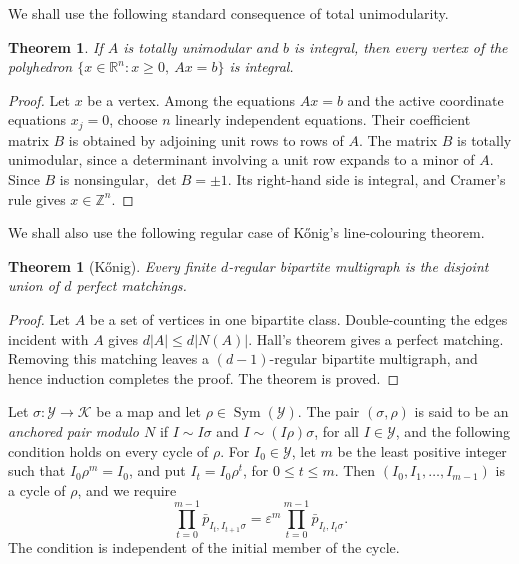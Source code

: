 \documentclass[11pt]{article}
\theoremstyle{plain}
\newtheorem{theorem}{Theorem}[section]
\theoremstyle{remark}
\theoremstyle{definition}
\theoremstyle{plain}
\newtheorem*{quotedtheorem}{Theorem}
\begin{document}
We shall use the following standard consequence of total unimodularity.

\begin{theorem}
If $A$ is totally unimodular and $b$ is integral, then every vertex of the
polyhedron $\{x\in\mathbb R^n:x\ge0,\ Ax=b\}$ is integral.
\end{theorem}

\begin{proof}
Let $x$ be a vertex. Among the equations $Ax=b$ and the active coordinate
equations $x_j=0$, choose $n$ linearly independent equations. Their coefficient
matrix $B$ is obtained by adjoining unit rows to rows of $A$. The matrix $B$ is
totally unimodular, since a determinant involving a unit row expands to a
minor of $A$. Since $B$ is nonsingular, $\det B=\pm1$. Its right-hand side is
integral, and Cramer's rule gives $x\in\mathbb Z^n$.
\end{proof}

We shall also use the following regular case of K\H{o}nig's line-colouring theorem.

\begin{quotedtheorem}[K\H{o}nig]
Every finite $d$-regular bipartite multigraph is the disjoint union of $d$
perfect matchings.
\end{quotedtheorem}

\begin{proof}
Let $A$ be a set of vertices in one bipartite class. Double-counting the
edges incident with $A$ gives $d|A|\le d|N(A)|$. Hall's theorem gives a
perfect matching. Removing this matching leaves a $(d-1)$-regular bipartite
multigraph, and hence induction completes the proof. The theorem is proved.
\end{proof}

Let $\sigma\colon\mathcal Y\to\mathcal K$ be a map and let
$\rho\in\operatorname{Sym}(\mathcal Y)$. The pair $(\sigma,\rho)$ is said
to be an \emph{anchored pair modulo $N$}  if $I\sim I\sigma$ and
$I\sim(I\rho)\sigma$, for all $I\in\mathcal Y$, and the following condition
holds on every cycle of $\rho$. For $I_0\in\mathcal Y$, let $m$ be the
least positive integer such that $I_0\rho^m=I_0$, and put
$I_t=I_0\rho^t$, for $0\le t\le m$. Then
$(I_0,I_1,\ldots,I_{m-1})$ is a cycle of $\rho$, and we require
\begin{equation}\label{eq:general-anchored-cycle-condition}
        \prod_{t=0}^{m-1}\bar p_{I_t,I_{t+1}\sigma}
        =
        \varepsilon^m\prod_{t=0}^{m-1}\bar p_{I_t,I_t\sigma}.
\end{equation}
The condition is independent of the initial member of the cycle.
\end{document}
